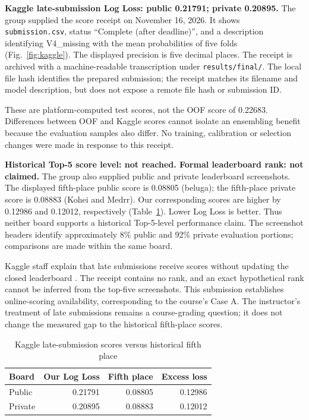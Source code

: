 \documentclass[journal]{IEEEtran}
\begin{document}
\textbf{Kaggle late-submission Log Loss: public 0.21791; private 0.20895.} The group supplied the score receipt on November 16, 2026. It shows \texttt{submission.csv}, status ``Complete (after deadline)'', and a description identifying V4\_missing with the mean probabilities of five folds (Fig.~\ref{fig:kaggle}). The displayed precision is five decimal places. The receipt is archived with a machine-readable transcription under \texttt{results/final/}. The local file hash identifies the prepared submission; the receipt matches its filename and model description, but does not expose a remote file hash or submission ID.

These are platform-computed test scores, not the OOF score of 0.22683. Differences between OOF and Kaggle scores cannot isolate an ensembling benefit because the evaluation samples also differ. No training, calibration or selection changes were made in response to this receipt.

\textbf{Historical Top-5 score level: not reached. Formal leaderboard rank: not claimed.} The group also supplied public and private leaderboard screenshots. The displayed fifth-place public score is 0.08805 (beluga); the fifth-place private score is 0.08883 (Kohei and Medrr). Our corresponding scores are higher by 0.12986 and 0.12012, respectively (Table~\ref{tab:kagglecomparison}). Lower Log Loss is better. Thus neither board supports a historical Top-5-level performance claim. The screenshot headers identify approximately 8\% public and 92\% private evaluation portions; comparisons are made within the same board.

Kaggle staff explain that late submissions receive scores without updating the closed leaderboard \cite{kagglelate}. The receipt contains no rank, and an exact hypothetical rank cannot be inferred from the top-five screenshots. This submission establishes online-scoring availability, corresponding to the course's Case A. The instructor's treatment of late submissions remains a course-grading question; it does not change the measured gap to the historical fifth-place scores.

\begin{table}[t]
\caption{Kaggle late-submission scores versus historical fifth place}
\label{tab:kagglecomparison}\centering
\begin{tabular}{lrrr}\toprule
Board & Our Log Loss & Fifth place & Excess loss\\\midrule
Public & 0.21791 & 0.08805 & 0.12986\\
Private & 0.20895 & 0.08883 & 0.12012\\\bottomrule
\end{tabular}
\end{table}
\end{document}
